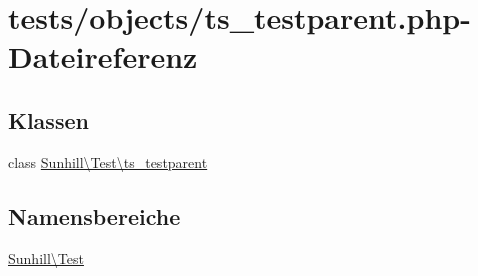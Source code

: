 \hypertarget{ts__testparent_8php}{}\section{tests/objects/ts\+\_\+testparent.php-\/\+Dateireferenz}
\label{ts__testparent_8php}
\subsection*{Klassen}
\begin{DoxyCompactItemize}
\item 
class \hyperlink{classSunhill_1_1Test_1_1ts__testparent}{Sunhill\textbackslash{}\+Test\textbackslash{}ts\+\_\+testparent}
\end{DoxyCompactItemize}
\subsection*{Namensbereiche}
\begin{DoxyCompactItemize}
\item 
 \hyperlink{namespaceSunhill_1_1Test}{Sunhill\textbackslash{}\+Test}
\end{DoxyCompactItemize}
